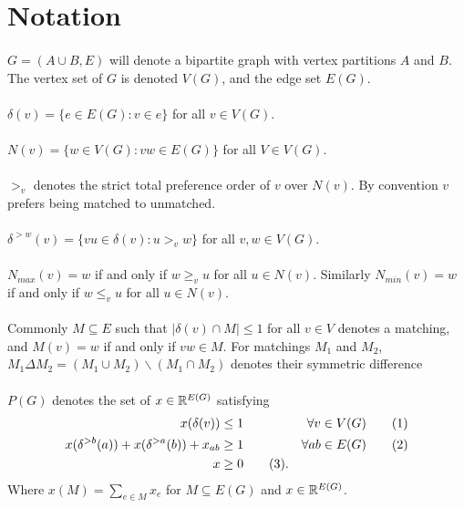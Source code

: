 \documentclass[letterpaper,12pt,oneside,onecolumn]{article}
\newcommand\numberthis{\addtocounter{equation}{1}\tag{\theequation}}
\begin{document}
\section*{Notation}
\paragraph{}
$G=(A\cup B, E)$ will denote a bipartite graph with vertex partitions $A$ and $B$. The vertex set of $G$ is denoted $V(G)$, and the edge set $E(G)$.
\paragraph{}
$\delta(v) = \{e \in E(G) : v \in e\}$ for all $v \in V(G)$.
\paragraph{}
$N(v) = \{w \in V(G): vw \in E(G)\}$ for all $V\in V(G)$.
\paragraph{}
$>_v$ denotes the strict total preference order of $v$ over $N(v)$. By convention $v$ prefers being matched to unmatched.
\paragraph{}
$\delta^{>w}(v) = \{vu \in \delta(v) : u >_v w\}$ for all $v,w \in V(G)$.
\paragraph{}
$N_{max}(v) = w$ if and only if $w \geq_v u$ for all $u \in N(v)$. Similarly $N_{min}(v) = w$ if and only if $w \leq_v u$ for all $u \in N(v)$.
\paragraph{}
Commonly $M \subseteq E$ such that $|\delta(v) \cap M| \leq 1$ for all $v \in V$ denotes a matching, and $M(v) = w $ if and only if $vw \in M$. For matchings $M_1$ and $M_2$, $M_1 \Delta M_2 = (M_1 \cup M_2) \backslash (M_1 \cap M_2)$ denotes their symmetric difference
\paragraph{}
$P(G)$ denotes the set of $x \in \mathbb{R}^{E(G)}$ satisfying
\begin{align*}
 x(\delta(v)) &\leq 1 &\forall v \in V(G) \numberthis \\
x(\delta^{>b}(a)) + x(\delta^{>a}(b)) + x_{ab} &\geq 1 &\forall ab \in E(G) \numberthis \\
x &\geq 0\numberthis.
\end{align*}
Where $x(M) = \sum_{e \in M} x_e$ for $M \subseteq E(G)$ and $x \in \mathbb{R}^{E(G)}$.
\end{document}
